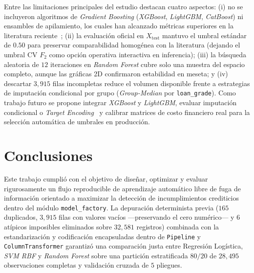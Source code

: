 \documentclass[conference]{IEEEtran}
\begin{document}
Entre las limitaciones principales del estudio destacan cuatro aspectos: (i) no se incluyeron algoritmos de \textit{Gradient Boosting} (\textit{XGBoost}, \textit{LightGBM}, \textit{CatBoost}) ni ensambles de apilamiento, los cuales han alcanzado métricas superiores en la literatura reciente~\cite{pucar2026consumer,mahmud2025stacking}; (ii) la evaluación oficial en $X_{\text{test}}$ mantuvo el umbral estándar de $0.50$ para preservar comparabilidad homogénea con la literatura (dejando el umbral CV $F_2$ como opción operativa interactiva en inferencia); (iii) la búsqueda aleatoria de $12$ iteraciones en \textit{Random Forest} cubre solo una muestra del espacio completo, aunque las gráficas 2D confirmaron estabilidad en meseta; y (iv) descartar $3{,}915$ filas incompletas reduce el volumen disponible frente a estrategias de imputación condicional por grupo (\textit{Group-Median} por \texttt{loan\_grade}). Como trabajo futuro se propone integrar \textit{XGBoost} y \textit{LightGBM}, evaluar imputación condicional o \textit{Target Encoding}~\cite{bolikulov2024categorical} y calibrar matrices de costo financiero real para la selección automática de umbrales en producción.

\section{Conclusiones}

Este trabajo cumplió con el objetivo de diseñar, optimizar y evaluar rigurosamente un flujo reproducible de aprendizaje automático libre de fuga de información orientado a maximizar la detección de incumplimientos crediticios dentro del módulo \texttt{model\_factory}. La depuración determinista previa ($165$ duplicados, $3{,}915$ filas con valores vacíos —preservando el cero numérico— y $6$ atípicos imposibles eliminados sobre $32{,}581$ registros) combinada con la estandarización y codificación encapsuladas dentro de \texttt{Pipeline} y \texttt{ColumnTransformer} garantizó una comparación justa entre Regresión Logística, \textit{SVM RBF} y \textit{Random Forest} sobre una partición estratificada $80/20$ de $28{,}495$ observaciones completas y validación cruzada de $5$ pliegues.
\end{document}
